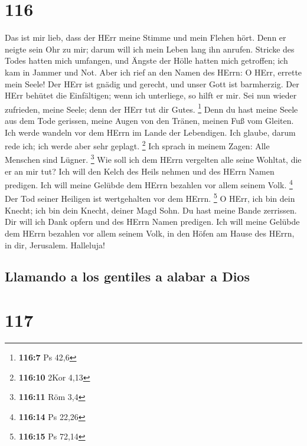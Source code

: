 \hypertarget{section-115}{%
\section{116}\label{section-115}}

 Das ist mir lieb, dass der HErr meine Stimme und mein
Flehen hört.  Denn er neigte sein Ohr zu mir; darum will
ich mein Leben lang ihn anrufen.  Stricke des Todes hatten
mich umfangen, und Ängste der Hölle hatten mich getroffen; ich kam in
Jammer und Not.  Aber ich rief an den Namen des HErrn: O
HErr, errette mein Seele!  Der HErr ist gnädig und
gerecht, und unser Gott ist barmherzig.  Der HErr behütet
die Einfältigen; wenn ich unterliege, so hilft er mir. 
Sei nun wieder zufrieden, meine Seele; denn der HErr tut dir Gutes.
\footnote{\textbf{116:7} Ps 42,6}  Denn du hast meine
Seele aus dem Tode gerissen, meine Augen von den Tränen, meinen Fuß vom
Gleiten.  Ich werde wandeln vor dem HErrn im Lande der
Lebendigen.  Ich glaube, darum rede ich; ich werde aber
sehr geplagt. \footnote{\textbf{116:10} 2Kor 4,13}  Ich
sprach in meinem Zagen: Alle Menschen sind Lügner. \footnote{\textbf{116:11}
  Röm 3,4}  Wie soll ich dem HErrn vergelten alle seine
Wohltat, die er an mir tut?  Ich will den Kelch des Heils
nehmen und des HErrn Namen predigen.  Ich will meine
Gelübde dem HErrn bezahlen vor allem seinem Volk. \footnote{\textbf{116:14}
  Ps 22,26}  Der Tod seiner Heiligen ist wertgehalten vor
dem HErrn. \footnote{\textbf{116:15} Ps 72,14}  O HErr,
ich bin dein Knecht; ich bin dein Knecht, deiner Magd Sohn. Du hast
meine Bande zerrissen.  Dir will ich Dank opfern und des
HErrn Namen predigen.  Ich will meine Gelübde dem HErrn
bezahlen vor allem seinem Volk,  in den Höfen am Hause
des HErrn, in dir, Jerusalem. Halleluja!

\hypertarget{llamando-a-los-gentiles-a-alabar-a-dios}{%
\subsection{Llamando a los gentiles a alabar a
Dios}\label{llamando-a-los-gentiles-a-alabar-a-dios}}

\hypertarget{section-116}{%
\section{117}\label{section-116}}

